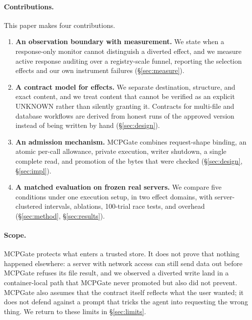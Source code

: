 \paragraph{Contributions.} This paper makes four contributions.
\begin{enumerate}
\item \textbf{An observation boundary with measurement.} We state when a
      response-only monitor cannot distinguish a diverted effect, and we measure
      active response auditing over a registry-scale funnel, reporting the
      selection effects and our own instrument failures
      (\S\ref{sec:measure}).
\item \textbf{A contract model for effects.} We separate destination,
      structure, and exact content, and we treat content that cannot be
      verified as an explicit UNKNOWN rather than silently granting it. Contracts
      for multi-file and database workflows are derived from honest runs of the
      approved version instead of being written by hand (\S\ref{sec:design}).
\item \textbf{An admission mechanism.} MCPGate combines request-shape binding,
      an atomic per-call allowance, private execution, writer shutdown, a single
      complete read, and promotion of the bytes that were checked
      (\S\ref{sec:design}, \S\ref{sec:impl}).
\item \textbf{A matched evaluation on frozen real servers.} We compare five
      conditions under one execution setup, in two effect domains, with
      server-clustered intervals, ablations, 100-trial race tests, and overhead
      (\S\ref{sec:method}, \S\ref{sec:results}).
\end{enumerate}

\paragraph{Scope.} MCPGate protects what enters a trusted store. It does not
prove that nothing happened elsewhere: a server with network access can still
send data out before MCPGate refuses its file result, and we observed a diverted
write land in a container-local path that MCPGate never promoted but also did
not prevent. MCPGate also assumes that the contract itself reflects what the
user wanted; it does not defend against a prompt that tricks the agent into
requesting the wrong thing. We return to these limits in
\S\ref{sec:limits}.

